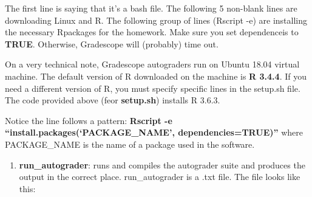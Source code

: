 \documentclass[
]{article}
\providecommand{\tightlist}{%
  \setlength{\itemsep}{0pt}\setlength{\parskip}{0pt}}
\begin{document}
\begin{center}
\end{center}

The first line is saying that it's a bash file. The following 5
non-blank lines are downloading Linux and R. The following group of
lines (Rscript -e) are installing the necessary Rpackages for the
homework. Make sure you set dependenceis to \textbf{TRUE}. Otherwise,
Gradescope will (probably) time out.

On a very technical note, Gradescope autograders run on Ubuntu 18.04
virtual machine. The default version of R downloaded on the machine is
\textbf{R 3.4.4}. If you need a different version of R, you must specify
specific lines in the setup.sh file. The code provided above (feor
\textbf{setup.sh}) installs R 3.6.3.

Notice the line follows a pattern: \textbf{Rscript -e
``install.packages(`PACKAGE\_NAME', dependencies=TRUE)''} where
PACKAGE\_NAME is the name of a package used in the software.

\begin{enumerate}
\def\labelenumi{(\arabic{enumi})}
\setcounter{enumi}{1}
\tightlist
\item
  \textbf{run\_autograder}: runs and compiles the autograder suite and
  produces the output in the correct place. run\_autograder is a .txt
  file. The file looks like this:
\end{enumerate}

\begin{center}
\end{center}
\end{document}
